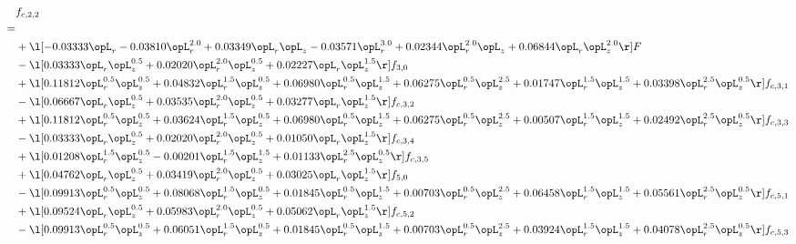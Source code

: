 \begin{alignat}{2} 
\label{eq:f_22_2} 
& f_{c,2,2} \nonumber \\ 
 = \\ 
& + \l[  -0.03333 \opL_r   -0.03810 \opL_r^{2.0} +  0.03349 \opL_r \opL_z   -0.03571 \opL_r^{3.0} +  0.02344 \opL_r^{2.0} \opL_z +  0.06844 \opL_r \opL_z^{2.0}  \r] F \nonumber \\ 
& - \l[  0.03333 \opL_r \opL_z^{0.5} +  0.02020 \opL_r^{2.0} \opL_z^{0.5} +  0.02227 \opL_r \opL_z^{1.5}  \r] f_{3,0} \nonumber \\ 
& + \l[  0.11812 \opL_r^{0.5} \opL_z^{0.5} +  0.04832 \opL_r^{1.5} \opL_z^{0.5} +  0.06980 \opL_r^{0.5} \opL_z^{1.5} +  0.06275 \opL_r^{0.5} \opL_z^{2.5} +  0.01747 \opL_r^{1.5} \opL_z^{1.5} +  0.03398 \opL_r^{2.5} \opL_z^{0.5}  \r] f_{c,3,1} \nonumber \\ 
& - \l[  0.06667 \opL_r \opL_z^{0.5} +  0.03535 \opL_r^{2.0} \opL_z^{0.5} +  0.03277 \opL_r \opL_z^{1.5}  \r] f_{c,3,2} \nonumber \\ 
& + \l[  0.11812 \opL_r^{0.5} \opL_z^{0.5} +  0.03624 \opL_r^{1.5} \opL_z^{0.5} +  0.06980 \opL_r^{0.5} \opL_z^{1.5} +  0.06275 \opL_r^{0.5} \opL_z^{2.5} +  0.00507 \opL_r^{1.5} \opL_z^{1.5} +  0.02492 \opL_r^{2.5} \opL_z^{0.5}  \r] f_{c,3,3} \nonumber \\ 
& - \l[  0.03333 \opL_r \opL_z^{0.5} +  0.02020 \opL_r^{2.0} \opL_z^{0.5} +  0.01050 \opL_r \opL_z^{1.5}  \r] f_{c,3,4} \nonumber \\ 
& + \l[  0.01208 \opL_r^{1.5} \opL_z^{0.5}   -0.00201 \opL_r^{1.5} \opL_z^{1.5} +  0.01133 \opL_r^{2.5} \opL_z^{0.5}  \r] f_{c,3,5} \nonumber \\ 
& + \l[  0.04762 \opL_r \opL_z^{0.5} +  0.03419 \opL_r^{2.0} \opL_z^{0.5} +  0.03025 \opL_r \opL_z^{1.5}  \r] f_{5,0} \nonumber \\ 
& - \l[  0.09913 \opL_r^{0.5} \opL_z^{0.5} +  0.08068 \opL_r^{1.5} \opL_z^{0.5} +  0.01845 \opL_r^{0.5} \opL_z^{1.5} +  0.00703 \opL_r^{0.5} \opL_z^{2.5} +  0.06458 \opL_r^{1.5} \opL_z^{1.5} +  0.05561 \opL_r^{2.5} \opL_z^{0.5}  \r] f_{c,5,1} \nonumber \\ 
& + \l[  0.09524 \opL_r \opL_z^{0.5} +  0.05983 \opL_r^{2.0} \opL_z^{0.5} +  0.05062 \opL_r \opL_z^{1.5}  \r] f_{c,5,2} \nonumber \\ 
& - \l[  0.09913 \opL_r^{0.5} \opL_z^{0.5} +  0.06051 \opL_r^{1.5} \opL_z^{0.5} +  0.01845 \opL_r^{0.5} \opL_z^{1.5} +  0.00703 \opL_r^{0.5} \opL_z^{2.5} +  0.03924 \opL_r^{1.5} \opL_z^{1.5} +  0.04078 \opL_r^{2.5} \opL_z^{0.5}  \r] f_{c,5,3} \nonumber \\ 

\end{alignat}
